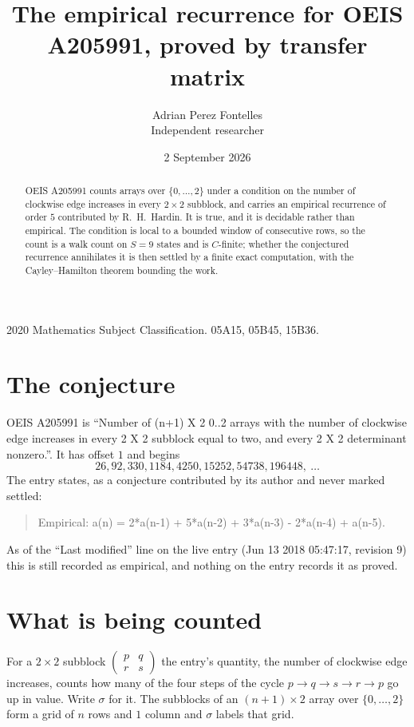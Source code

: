 \documentclass[11pt,a4paper]{article}
\title{The empirical recurrence for OEIS A205991, proved by transfer matrix}
\author{Adrian Perez Fontelles\\ \small Independent researcher}
\date{2 September 2026}
\theoremstyle{plain}
\theoremstyle{definition}
\begin{document}
\maketitle

\begin{abstract}
OEIS A205991 counts arrays over $\{0,\dots,2\}$ under a condition on the number of clockwise edge increases
in every $2\times2$ subblock, and carries an empirical recurrence of order $5$ contributed by
R.~H.~Hardin. It is true, and it is decidable rather than empirical. The condition is local to
a bounded window of consecutive rows, so the count is a walk count on $S=9$ states and is
$C$-finite; whether the conjectured recurrence annihilates it is then settled by a finite exact
computation, with the Cayley--Hamilton theorem bounding the work.
\end{abstract}

\noindent\small 2020 Mathematics Subject Classification. 05A15, 05B45, 15B36.\normalsize

\section{The conjecture}

OEIS A205991 is ``Number of (n+1) X 2 0..2 arrays with the number of clockwise edge increases in every 2 X 2 subblock equal to two, and every 2 X 2 determinant nonzero.''. It has offset $1$ and begins
\[
26, 92, 330, 1184, 4250, 15252, 54738, 196448,\ \dots
\]
The entry states, as a conjecture contributed by its author and never marked settled:
\begin{quote}
Empirical: a(n) = 2*a(n-1) + 5*a(n-2) + 3*a(n-3) - 2*a(n-4) + a(n-5).
\end{quote}
As of the ``Last modified'' line on the live entry (Jun 13 2018 05:47:17, revision 9) this is still
recorded as empirical, and nothing on the entry records it as proved.

\section{What is being counted}

For a $2\times2$ subblock $\begin{pmatrix}p&q\\r&s\end{pmatrix}$ the
entry's quantity, the number of clockwise edge increases, counts how many of the four steps of the cycle $p\to q\to s\to r\to p$ go up in value. Write $\sigma$ for it. The subblocks of an
$(n+1)\times2$ array over $\{0,\dots,2\}$ form a grid of $n$ rows and $1$
column and $\sigma$ labels that grid.
\end{document}
